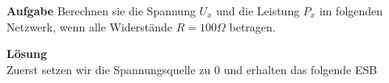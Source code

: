 										 \beginip
											\textbf{Aufgabe} Berechnen sie die Spannung $U_x$ und die Leistung $P_x$ im folgenden Netzwerk, wenn alle Widerstände $ R = 100 \Omega$ betragen. \\
											\begin{center}
												\fix
											\end{center}
											\iend

											\beginip
											\textbf{Lösung}
											\\
											Zuerst setzen wir die Spannungsquelle zu 0 und erhalten das folgende ESB \\
											\begin{center}
												\fix
											\end{center}

